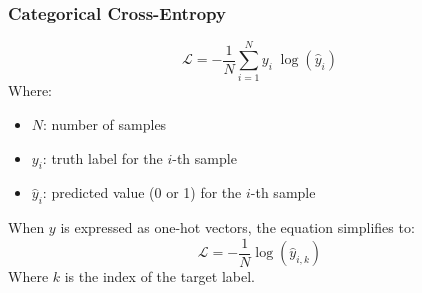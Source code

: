 \documentclass[a4paper]{article}
\newcommand{\haty}{\hat{y}}
\newcommand{\ELL}{\mathcal{L}}
\begin{document}
\subsubsection*{Categorical Cross-Entropy}
\begin{equation*}
    \ELL = -\frac{1}{N} \sum_{i=1}^{N} y_i \; \log(\haty_i)
\end{equation*}
Where:
\begin{itemize}
    \item $N$: number of samples
    \item $y_i$: truth label for the $i$-th sample
    \item $\haty_i$: predicted value (0 or 1) for the $i$-th sample
\end{itemize}
When $y$ is expressed as one-hot vectors, the equation simplifies to:
\begin{equation*}
    \ELL = -\frac{1}{N} \log(\haty_{i,k})
\end{equation*}
Where $k$ is the index of the target label.


\newpage
\end{document}
